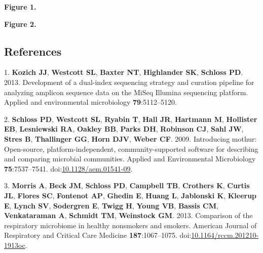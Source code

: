 \documentclass[]{article}
\begin{document}
\newpage

\textbf{Figure 1.}

\newpage

\textbf{Figure 2.}

\newpage

\subsection{References}\label{references}

1. \textbf{Kozich JJ}, \textbf{Westcott SL}, \textbf{Baxter NT},
\textbf{Highlander SK}, \textbf{Schloss PD}. 2013. Development of a
dual-index sequencing strategy and curation pipeline for analyzing
amplicon sequence data on the MiSeq Illumina sequencing platform.
Applied and environmental microbiology \textbf{79}:5112--5120.

2. \textbf{Schloss PD}, \textbf{Westcott SL}, \textbf{Ryabin T},
\textbf{Hall JR}, \textbf{Hartmann M}, \textbf{Hollister EB},
\textbf{Lesniewski RA}, \textbf{Oakley BB}, \textbf{Parks DH},
\textbf{Robinson CJ}, \textbf{Sahl JW}, \textbf{Stres B},
\textbf{Thallinger GG}, \textbf{Horn DJV}, \textbf{Weber CF}. 2009.
Introducing mothur: Open-source, platform-independent,
community-supported software for describing and comparing microbial
communities. Applied and Environmental Microbiology
\textbf{75}:7537--7541.
doi:\href{http://dx.doi.org/10.1128/aem.01541-09}{10.1128/aem.01541-09}.

3. \textbf{Morris A}, \textbf{Beck JM}, \textbf{Schloss PD},
\textbf{Campbell TB}, \textbf{Crothers K}, \textbf{Curtis JL},
\textbf{Flores SC}, \textbf{Fontenot AP}, \textbf{Ghedin E},
\textbf{Huang L}, \textbf{Jablonski K}, \textbf{Kleerup E},
\textbf{Lynch SV}, \textbf{Sodergren E}, \textbf{Twigg H}, \textbf{Young
VB}, \textbf{Bassis CM}, \textbf{Venkataraman A}, \textbf{Schmidt TM},
\textbf{Weinstock GM}. 2013. Comparison of the respiratory microbiome in
healthy nonsmokers and smokers. American Journal of Respiratory and
Critical Care Medicine \textbf{187}:1067--1075.
doi:\href{http://dx.doi.org/10.1164/rccm.201210-1913oc}{10.1164/rccm.201210-1913oc}.
\end{document}
